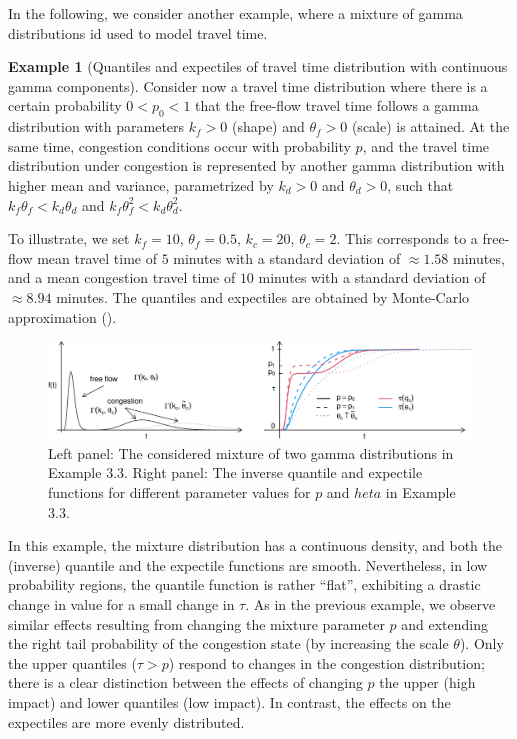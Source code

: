 \documentclass[preprint, 3p, authoryear]{elsarticle} %
\theoremstyle{definition}
\theoremstyle{definition}
\newtheorem{example}{Example}[section]
\theoremstyle{definition}
\theoremstyle{definition}
\theoremstyle{remark}
\begin{document}
In the following, we consider another example, where a mixture of gamma distributions id used to model travel time.

\begin{example}[Quantiles and expectiles of travel time distribution with continuous gamma components]
\protect\hypertarget{exm:qdzheng}{}\label{exm:qdzheng}Consider now a travel time distribution where there is a certain probability \(0<p_0<1\) that the free-flow travel time follows a gamma distribution with parameters \(k_f>0\) (shape) and \(\theta_f>0\) (scale) is attained. At the same time, congestion conditions occur with probability \(p\), and the travel time distribution under congestion is represented by another gamma distribution with higher mean and variance, parametrized by \(k_d>0\) and \(\theta_d>0\), such that \(k_f\theta_f<k_d\theta_d\) and \(k_f\theta^2_f<k_d\theta^2_d\).

To illustrate, we set \(k_f=10\), \(\theta_f=0.5\), \(k_c=20\), \(\theta_c=2\). This corresponds to a free-flow mean travel time of \(5\) minutes with a standard deviation of \(\approx 1.58\) minutes, and a mean congestion travel time of \(10\) minutes with a standard deviation of \(\approx 8.94\) minutes. The quantiles and expectiles are obtained by Monte-Carlo approximation (\citet{daouia_etal24}).

\begin{figure}
\includegraphics[width=1\linewidth]{traffic-expectiles_files/figure-latex/figexp3-1} \caption{Left panel: The considered mixture of two gamma distributions in Example 3.3. Right panel: The inverse quantile and expectile functions for different parameter values for $p$ and $  heta$ in Example 3.3.}\label{fig:figexp3}
\end{figure}

In this example, the mixture distribution has a continuous density, and both the (inverse) quantile and the expectile functions are smooth. Nevertheless, in low probability regions, the quantile function is rather ``flat'', exhibiting a drastic change in value for a small change in \(\tau\). As in the previous example, we observe similar effects resulting from changing the mixture parameter \(p\) and extending the right tail probability of the congestion state (by increasing the scale \(\theta\)). Only the upper quantiles (\(\tau>p\)) respond to changes in the congestion distribution; there is a clear distinction between the effects of changing \(p\) the upper (high impact) and lower quantiles (low impact). In contrast, the effects on the expectiles are more evenly distributed.
\end{example}
\end{document}

